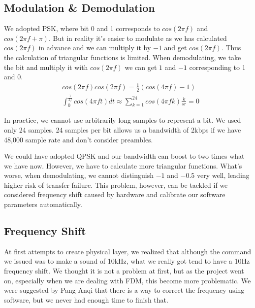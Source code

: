 \documentclass[conference,compsoc]{IEEEtran}
\begin{document}
		\subsection{Modulation \& Demodulation}
			We adopted PSK, where bit 0 and 1 corresponds to $cos(2\pi f)$ and $cos(2\pi f + \pi)$. 
			But in reality it's easier to modulate as we has calculated $cos(2\pi f)$ in advance and we can multiply it by $-1$ and get $cos(2\pi f)$.
			Thus the calculation of triangular functions is limited.
			When demodulating, we take the bit and multiply it with $cos(2\pi f)$ we can get $1$ and $-1$ corresponding to 1 and 0.
			\begin{equation*}\begin{aligned}
				& cos(2\pi f)cos(2\pi f) = \frac{1}{2}(cos(4\pi f) - 1) \\
				& \int_0^\frac{1}{2f} cos(4\pi ft)dt \approx \sum_{k=1}^{24}cos(4\pi fk)\frac{k}{sr} = 0
			\end{aligned}\end{equation*}
			\par
			In practice, we cannot use arbitrarily long samples to represent a bit. We used only 24 samples. 
			24 samples per bit allows us a bandwidth of 2kbps if we have 48,000 sample rate and don't consider preambles.
			\par
			We could have adopted QPSK and our bandwidth can boost to two times what we have now. 
			However, we have to calculate more triangular functions. 
			What's worse, when demodulating, we cannot distinguish $-1$ and $-0.5$ very well, leading higher risk of transfer failure.
			This problem, however, can be tackled if we considered frequency shift caused by hardware and calibrate our software parameters automatically.

	\subsection{Frequency Shift}
		At first attempts to create physical layer, we realized that although the command we issued was to make a sound of 10kHz, what we really got tend to have a 10Hz frequency shift.
		We thought it is not a problem at first, but as the project went on, especially when we are dealing with FDM, this become more problematic.
		We were suggested by Pang Anqi that there is a way to correct the frequency using software, but we never had enough time to finish that.
\end{document}

